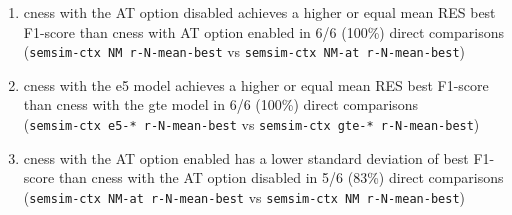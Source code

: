 \documentclass[11pt]{scrreprt}
\newcounter{listcounter}
\begin{document}
{\begin{enumerate}[label=\arabic{listcounter}.\arabic*]
	\item \gls{cness} with the AT option disabled achieves a higher or equal mean RES best F1-score than \gls{cness} with AT option enabled in 6/6 (100\%) direct comparisons \\(\texttt{semsim-ctx NM r-N-mean-best} vs \texttt{semsim-ctx NM-at r-N-mean-best}) \label{obs-itm:cness-better-without-AT}
	\item \gls{cness} with the e5 model achieves a higher or equal mean RES best F1-score than \gls{cness} with the gte model in 6/6 (100\%) direct comparisons \\ (\texttt{semsim-ctx e5-* r-N-mean-best} vs \texttt{semsim-ctx gte-* r-N-mean-best}) \label{obs-itm:cness-e5-better-than-gte}
	\item \gls{cness} with the AT option enabled has a lower standard deviation of best F1-score than \gls{cness} with the AT option disabled in 5/6 (83\%) direct comparisons \\ (\texttt{semsim-ctx NM-at r-N-mean-best} vs \texttt{semsim-ctx NM r-N-mean-best}) \label{obs-itm:cness-lower-variation-with-AT}
\end{enumerate}


}
\end{document}
